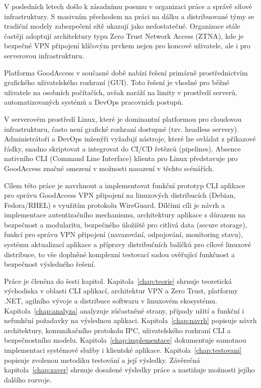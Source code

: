 \label{chap:uvod}

V posledních letech došlo k zásadnímu posunu v organizaci práce a správě síťové infrastruktury. S masivním přechodem na práci na dálku a distribuované týmy se tradiční modely zabezpečení sítě ukazují jako nedostatečné. Organizace stále častěji adoptují architektury typu Zero Trust Network Access (ZTNA), kde je bezpečné VPN připojení klíčovým prvkem nejen pro koncové uživatele, ale i pro serverovou infrastrukturu.

Platforma GoodAccess v současné době nabízí řešení primárně prostřednictvím grafického uživatelského rozhraní (GUI). Toto řešení je vhodné pro běžné uživatele na osobních počítačích, avšak naráží na limity v prostředí serverů, automatizovaných systémů a DevOps pracovních postupů.

V serverovém prostředí Linux, které je dominantní platformou pro cloudovou infrastrukturu, často není grafické rozhraní dostupné (tzv. headless servery). Administrátoři a DevOps inženýři vyžadují nástroje, které lze ovládat z příkazové řádky, snadno skriptovat a integrovat do CI/CD řetězců (pipelines). Absence nativního CLI (Command Line Interface) klienta pro Linux představuje pro GoodAccess značné omezení v možnosti nasazení v těchto scénářích.

Cílem této práce je navrhnout a implementovat funkční prototyp CLI aplikace pro správu GoodAccess VPN připojení na linuxových distribucích (Debian, Fedora/RHEL) s využitím protokolu WireGuard. Dílčími cíli je návrh a implementace autentizačního mechanismu, architektury aplikace s důrazem na bezpečnost a modularitu, bezpečného úložiště pro citlivá data (secure storage), funkcí pro správu VPN připojení (navazování, odpojování, monitoring stavu), systému aktualizací aplikace a přípravy distribučních balíčků pro cílové linuxové distribuce, to vše doplněné komplexní testovací sadou ověřující funkčnost a bezpečnost výsledného řešení.

Práce je členěna do šesti kapitol. Kapitola~\ref{chap:teorie} shrnuje teoretická východiska v oblasti CLI aplikací, architektur VPN a Zero Trust, platformy .NET, agilního vývoje a distribuce softwaru v linuxovém ekosystému. Kapitola~\ref{chap:analyza} analyzuje zúčastněné strany, případy užití a funkční i nefunkční požadavky na výslednou aplikaci. Kapitola~\ref{chap:navrh} popisuje návrh architektury, komunikačního protokolu IPC, uživatelského rozhraní CLI a bezpečnostního modelu. Kapitola~\ref{chap:implementace} dokumentuje samotnou implementaci systémové služby i klientské aplikace. Kapitola~\ref{chap:testovani} popisuje zvolenou metodiku testování a její výsledky. Závěrečná kapitola~\ref{chap:zaver} shrnuje dosažené výsledky práce a nastiňuje možnosti jejího dalšího rozvoje.

